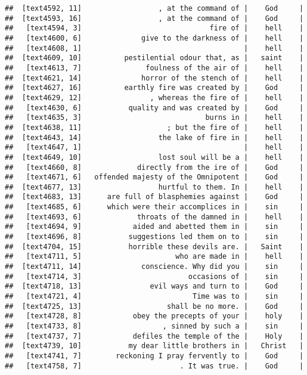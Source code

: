 \documentclass[]{article}
\begin{document}
\begin{verbatim}
##  [text4592, 11]                  , at the command of |    God     |
##  [text4593, 16]                  , at the command of |    God     |
##   [text4594, 3]                              fire of |    hell    |
##   [text4600, 6]              give to the darkness of |    hell    |
##   [text4608, 1]                                      |    hell    |
##  [text4609, 10]          pestilential odour that, as |   saint    |
##   [text4613, 7]               foulness of the air of |    hell    |
##  [text4621, 14]              horror of the stench of |    hell    |
##  [text4627, 16]          earthly fire was created by |    God     |
##  [text4629, 12]                , whereas the fire of |    hell    |
##   [text4630, 6]           quality and was created by |    God     |
##   [text4635, 3]                             burns in |    hell    |
##  [text4638, 11]                    ; but the fire of |    hell    |
##  [text4643, 14]                  the lake of fire in |    hell    |
##   [text4647, 1]                                      |    hell    |
##  [text4649, 10]                  lost soul will be a |    hell    |
##   [text4660, 8]             directly from the ire of |    God     |
##   [text4671, 6]   offended majesty of the Omnipotent |    God     |
##  [text4677, 13]                  hurtful to them. In |    hell    |
##  [text4683, 13]      are full of blasphemies against |    God     |
##   [text4685, 6]      which were their accomplices in |    sin     |
##   [text4693, 6]             throats of the damned in |    hell    |
##   [text4694, 9]            aided and abetted them in |    sin     |
##   [text4696, 8]           suggestions led them on to |    sin     |
##  [text4704, 15]           horrible these devils are. |   Saint    |
##   [text4711, 5]                      who are made in |    hell    |
##  [text4711, 14]              conscience. Why did you |    sin     |
##   [text4714, 3]                         occasions of |    sin     |
##  [text4718, 13]                evil ways and turn to |    God     |
##   [text4721, 4]                          Time was to |    sin     |
##  [text4725, 13]                    shall be no more. |    God     |
##   [text4728, 8]            obey the precepts of your |    holy    |
##   [text4733, 8]                   , sinned by such a |    sin     |
##   [text4737, 7]            defiles the temple of the |    Holy    |
##  [text4739, 10]           my dear little brothers in |   Christ   |
##   [text4741, 7]        reckoning I pray fervently to |    God     |
##   [text4758, 7]                       . It was true. |    God     |

\end{verbatim}
\end{document}
